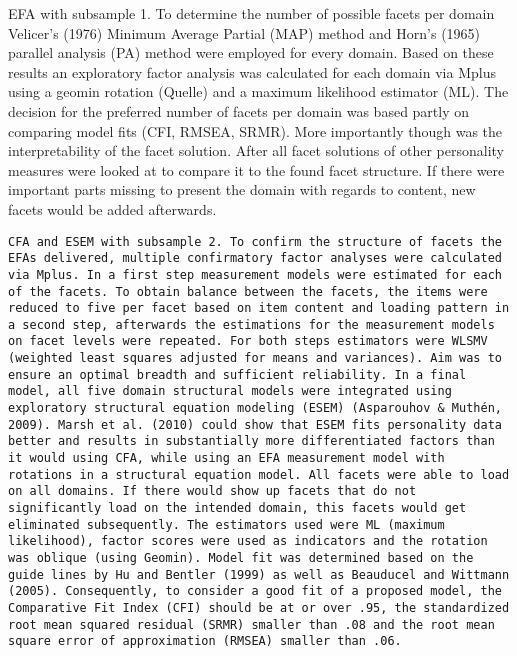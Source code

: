 \documentclass[man]{apa6}
\theoremstyle{definition}
\theoremstyle{definition}
\theoremstyle{definition}
\theoremstyle{remark}
\begin{document}
EFA with subsample 1. To determine the number of possible facets per
domain Velicer's (1976) Minimum Average Partial (MAP) method and Horn's
(1965) parallel analysis (PA) method were employed for every domain.
Based on these results an exploratory factor analysis was calculated for
each domain via Mplus using a geomin rotation (Quelle) and a maximum
likelihood estimator (ML). The decision for the preferred number of
facets per domain was based partly on comparing model fits (CFI, RMSEA,
SRMR). More importantly though was the interpretability of the facet
solution. After all facet solutions of other personality measures were
looked at to compare it to the found facet structure. If there were
important parts missing to present the domain with regards to content,
new facets would be added afterwards.

\begin{verbatim}
CFA and ESEM with subsample 2. To confirm the structure of facets the EFAs delivered, multiple confirmatory factor analyses were calculated via Mplus. In a first step measurement models were estimated for each of the facets. To obtain balance between the facets, the items were reduced to five per facet based on item content and loading pattern in a second step, afterwards the estimations for the measurement models on facet levels were repeated. For both steps estimators were WLSMV (weighted least squares adjusted for means and variances). Aim was to ensure an optimal breadth and sufficient reliability. In a final model, all five domain structural models were integrated using exploratory structural equation modeling (ESEM) (Asparouhov & Muthén, 2009). Marsh et al. (2010) could show that ESEM fits personality data better and results in substantially more differentiated factors than it would using CFA, while using an EFA measurement model with rotations in a structural equation model. All facets were able to load on all domains. If there would show up facets that do not significantly load on the intended domain, this facets would get eliminated subsequently. The estimators used were ML (maximum likelihood), factor scores were used as indicators and the rotation was oblique (using Geomin). Model fit was determined based on the guide lines by Hu and Bentler (1999) as well as Beauducel and Wittmann (2005). Consequently, to consider a good fit of a proposed model, the Comparative Fit Index (CFI) should be at or over .95, the standardized root mean squared residual (SRMR) smaller than .08 and the root mean square error of approximation (RMSEA) smaller than .06. 
\end{verbatim}
\end{document}
